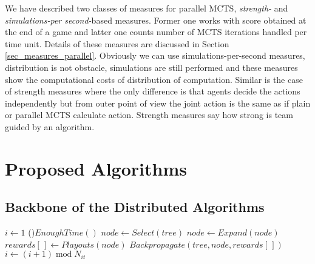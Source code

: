 We have described two classes of measures for parallel MCTS, \emph{strength-} and
\emph{simulations-per second-}based measures. Former one works with score obtained at the end
of a game and latter one counts number of MCTS iterations handled per time unit. Details of
these measures are discussed in Section \ref{sec_measures_parallel}. Obviously we can use
simulations-per-second measures, distribution is not obstacle, simulations are still performed
and these measures show the computational costs of distribution of computation. Similar is the
case of strength measures where the only difference is that agents decide the actions
independently but from outer point of view the joint action is the same as if plain or parallel
MCTS calculate action. Strength measures say how strong is team guided by an algorithm.

\section{Proposed Algorithms}


\subsection{Backbone of the Distributed Algorithms}
\label{sec_dmcts_common}

\begin{algorithm}
\DontPrintSemicolon
\caption{$DistributedMCTSLoop(tree)$\label{alg_dmcts_common}}
$i \leftarrow 1$\;
\While(){$EnoughTime()$}{
    $node \leftarrow Select(tree)$ \;
    $node \leftarrow Expand(node)$ \;
    $rewards[\,] \leftarrow Playouts(node)$ \;
    $Backpropagate(tree,node,rewards[\,])$ \;
    $i \leftarrow (i + 1)\;\mathrm{mod}\;N_{it}$\;
}
 \;
\end{algorithm}

